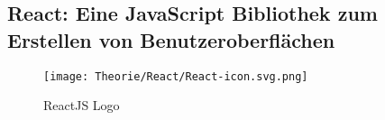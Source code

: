 \subsection{React: Eine JavaScript Bibliothek zum Erstellen von Benutzeroberflächen}
\label{reactjs}


\begin{figure}[H]
  \begin{center}
    \texttt{[image: Theorie/React/React-icon.svg.png]}
    \caption{ReactJS Logo \cite{reactjs}}
  \end{center}
\end{figure}


